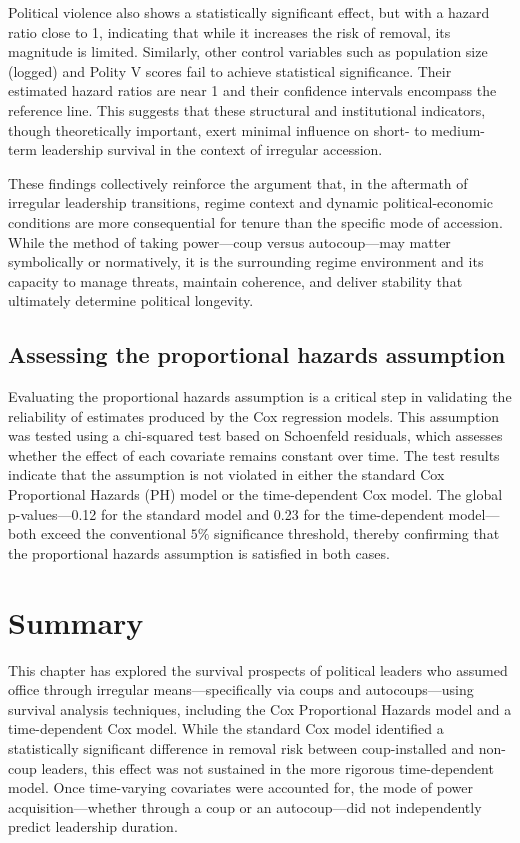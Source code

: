 \documentclass[
  12pt,
]{report}
\begin{document}
Political violence also shows a statistically significant effect, but
with a hazard ratio close to 1, indicating that while it increases the
risk of removal, its magnitude is limited. Similarly, other control
variables such as population size (logged) and Polity V scores fail to
achieve statistical significance. Their estimated hazard ratios are near
1 and their confidence intervals encompass the reference line. This
suggests that these structural and institutional indicators, though
theoretically important, exert minimal influence on short- to
medium-term leadership survival in the context of irregular accession.

These findings collectively reinforce the argument that, in the
aftermath of irregular leadership transitions, regime context and
dynamic political-economic conditions are more consequential for tenure
than the specific mode of accession. While the method of taking
power---coup versus autocoup---may matter symbolically or normatively,
it is the surrounding regime environment and its capacity to manage
threats, maintain coherence, and deliver stability that ultimately
determine political longevity.

\subsection*{Assessing the proportional hazards
assumption}\label{assessing-the-proportional-hazards-assumption}

Evaluating the proportional hazards assumption is a critical step in
validating the reliability of estimates produced by the Cox regression
models. This assumption was tested using a chi-squared test based on
Schoenfeld residuals, which assesses whether the effect of each
covariate remains constant over time. The test results indicate that the
assumption is not violated in either the standard Cox Proportional
Hazards (PH) model or the time-dependent Cox model. The global
p-values---0.12 for the standard model and 0.23 for the time-dependent
model---both exceed the conventional \(5\%\) significance threshold,
thereby confirming that the proportional hazards assumption is satisfied
in both cases.

\section{Summary}\label{summary-2}

This chapter has explored the survival prospects of political leaders
who assumed office through irregular means---specifically via coups and
autocoups---using survival analysis techniques, including the Cox
Proportional Hazards model and a time-dependent Cox model. While the
standard Cox model identified a statistically significant difference in
removal risk between coup-installed and non-coup leaders, this effect
was not sustained in the more rigorous time-dependent model. Once
time-varying covariates were accounted for, the mode of power
acquisition---whether through a coup or an autocoup---did not
independently predict leadership duration.
\end{document}
